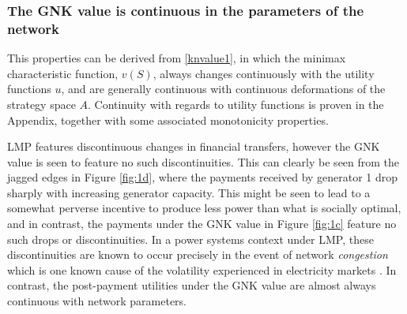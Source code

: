 
\subsubsection*{The GNK value is continuous in the parameters of the network}
This properties can be derived from \eqref{knvalue1}, in which the minimax characteristic function, $v(S)$,
always changes continuously with the utility functions $u$, and are generally continuous with continuous deformations of the strategy space $A$.
Continuity with regards to utility functions is proven in the Appendix, together with some associated monotonicity properties.

LMP features discontinuous changes in financial transfers, however the GNK value is seen to feature no such discontinuities.
This can clearly be seen from the jagged edges in Figure \ref{fig:1d}, where the payments received by generator 1 drop sharply with increasing generator capacity. 
This might be seen to lead to a somewhat perverse incentive to produce less power than what is socially optimal, and in contrast, the payments under the GNK value in Figure \ref{fig:1c} feature no such drops or discontinuities.
In a power systems context under LMP, these discontinuities are known to occur precisely in the event of network \emph{congestion}
which is one known cause of the volatility experienced in
electricity markets \cite{RePEc:aen:journl:2006v27-02-a09}. 
In contrast, the post-payment utilities under the GNK value are almost always continuous with network parameters.



